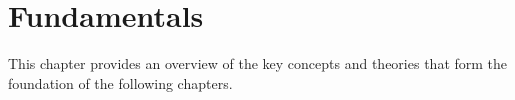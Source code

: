 \chapter{Fundamentals}
\label{chap:Foundations}
\minitoc
This chapter provides an overview of the key concepts and theories that form the foundation of the following chapters. 










